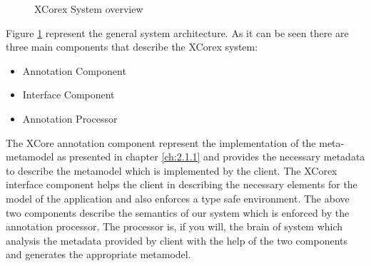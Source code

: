\begin{figure}
\centering
{}
\caption{XCorex System overview}
\label{fig:XCoreSystem}
\end{figure}

	Figure \ref{fig:XCoreSystem} represent the  general system architecture. 
As it can be seen there are three main components that describe the XCorex
system:
	\begin{itemize}
	  \item Annotation Component
	  \item Interface  Component
	  \item Annotation Processor
	\end{itemize}
	The XCore annotation component represent the implementation of the
meta-metamodel as presented in chapter \ref{ch:2.1.1} and provides the necessary
metadata to describe the metamodel which is implemented by the client. 
	The XCorex interface component helps the client in describing the necessary
elements for the model of the application and also enforces a type safe environment.
	The above two components describe the semantics of our system which is enforced 
by the annotation processor. The processor is, if you will, the brain of system
which analysis the metadata provided by client with the help of the two
components and generates the appropriate metamodel. 

